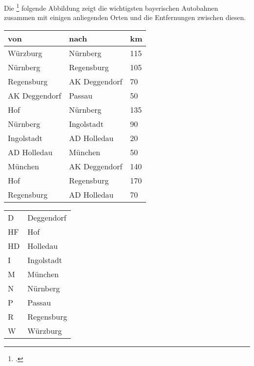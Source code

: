 \documentclass{bschlangaul-aufgabe}
\begin{document}

\def\p{ $\rightarrow$ }

Die \footcite{examen:66115:2017:03}
folgende Abbildung zeigt die wichtigsten bayerischen Autobahnen zusammen
mit einigen anliegenden Orten und die Entfernungen zwischen diesen.


\begin{tabular}{l|l|l}
von           & nach          & km\\\hline\hline
Würzburg      & Nürnberg      & 115\\
Nürnberg      & Regensburg    & 105\\
Regensburg    & AK Deggendorf & 70\\
AK Deggendorf & Passau        & 50\\\hline
Hof           & Nürnberg      & 135\\
Nürnberg      & Ingolstadt    & 90\\
Ingolstadt    & AD Holledau   & 20\\
AD Holledau   & München       & 50\\\hline
München       & AK Deggendorf & 140\\\hline
Hof           & Regensburg    & 170\\
Regensburg    & AD Holledau   & 70\\
\end{tabular}


\begin{tabular}{ll}
D  & Deggendorf\\
HF & Hof\\
HD & Holledau\\
I  & Ingolstadt\\
M  & München\\
N  & Nürnberg\\
P  & Passau\\
R  & Regensburg\\
W  & Würzburg\\
\end{tabular}
\end{document}
